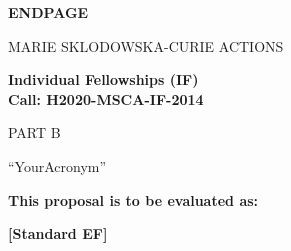 \documentclass[a4paper,11pt]{article}
\newcommand{\acronym}{{\sc YourAcronym}\xspace}
\begin{document}
\newpage
\vspace{15mm}
\begin{center}


        \Large{
      
     
        \textbf{ENDPAGE}
  
          \vspace{15mm}
          MARIE SKLODOWSKA-CURIE ACTIONS\\
          \vspace{1cm}
          
          \textbf{Individual Fellowships (IF)}\\
          \textbf{Call: H2020-MSCA-IF-2014}
          \vspace{2cm}                   

          PART B
          \vspace{2.5cm}

          ``\acronym''
          \vspace{2cm}

          \textbf{This proposal is to be evaluated as:}
          \vspace{.5cm}

          \textbf{[Standard EF]}
        }

  \end{center}
\vspace{1cm}
\end{document}
